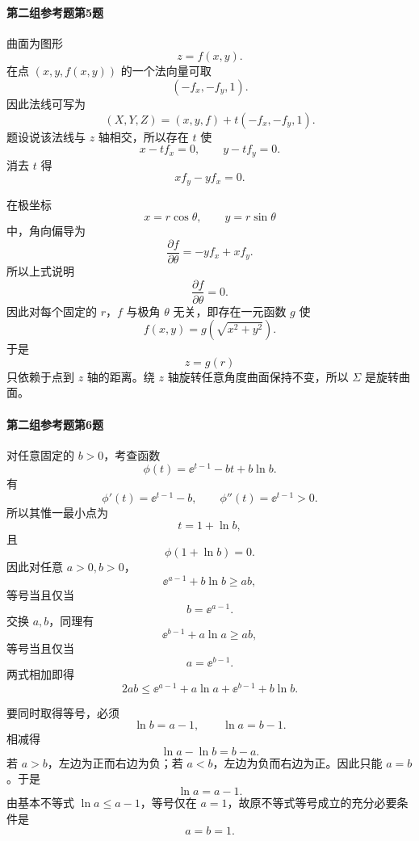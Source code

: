 \paragraph{第二组参考题第5题}
\begin{xsolution}
曲面为图形
\[
  z=f(x,y).
\]
在点 $(x,y,f(x,y))$ 的一个法向量可取
\[
  (-f_x,-f_y,1).
\]
因此法线可写为
\[
  (X,Y,Z)=(x,y,f)+t(-f_x,-f_y,1).
\]
题设说该法线与 $z$ 轴相交，所以存在 $t$ 使
\[
  x-tf_x=0,
  \qquad
  y-tf_y=0.
\]
消去 $t$ 得
\[
  xf_y-yf_x=0.
\]

在极坐标
\[
  x=r\cos\theta,
  \qquad
  y=r\sin\theta
\]
中，角向偏导为
\[
  \frac{\partial f}{\partial\theta}
  =-y f_x+x f_y.
\]
所以上式说明
\[
  \frac{\partial f}{\partial\theta}=0.
\]
因此对每个固定的 $r$，$f$ 与极角 $\theta$ 无关，即存在一元函数 $g$ 使
\[
  f(x,y)=g\left(\sqrt{x^2+y^2}\right).
\]
于是
\[
  z=g(r)
\]
只依赖于点到 $z$ 轴的距离。绕 $z$ 轴旋转任意角度曲面保持不变，所以 $\Sigma$ 是旋转曲面。
\end{xsolution}

\paragraph{第二组参考题第6题}
\begin{xsolution}
对任意固定的 $b>0$，考查函数
\[
  \phi(t)=\ee^{t-1}-bt+b\ln b.
\]
有
\[
  \phi'(t)=\ee^{t-1}-b,
  \qquad
  \phi''(t)=\ee^{t-1}>0.
\]
所以其惟一最小点为
\[
  t=1+\ln b,
\]
且
\[
  \phi(1+\ln b)=0.
\]
因此对任意 $a>0,b>0$，
\[
  \ee^{a-1}+b\ln b\ge ab,
\]
等号当且仅当
\[
  b=\ee^{a-1}.
\]
交换 $a,b$，同理有
\[
  \ee^{b-1}+a\ln a\ge ab,
\]
等号当且仅当
\[
  a=\ee^{b-1}.
\]
两式相加即得
\[
  2ab\le\ee^{a-1}+a\ln a+\ee^{b-1}+b\ln b.
\]

要同时取得等号，必须
\[
  \ln b=a-1,
  \qquad
  \ln a=b-1.
\]
相减得
\[
  \ln a-\ln b=b-a.
\]
若 $a>b$，左边为正而右边为负；若 $a<b$，左边为负而右边为正。因此只能 $a=b$。于是
\[
  \ln a=a-1.
\]
由基本不等式 $\ln a\le a-1$，等号仅在 $a=1$，故原不等式等号成立的充分必要条件是
\[
  a=b=1.
\]
\end{xsolution}

